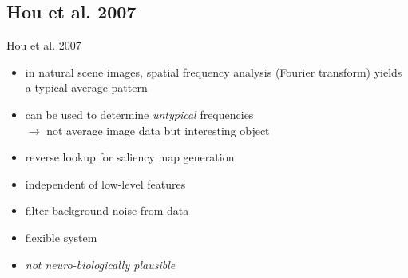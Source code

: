 \documentclass[compress,t]{beamer}
\begin{document}
\subsection{Hou et al. 2007}
\begin{frame}{Hou et al. 2007}
    \begin{itemize}
        \item in natural scene images, spatial frequency analysis (Fourier transform) yields a typical average pattern
        \item can be used to determine \emph{untypical} frequencies \\ $\rightarrow$ not average image data but interesting object
        \item reverse lookup for saliency map generation
    \end{itemize}
    \pause
    \begin{itemize}
        \item independent of low-level features
        \item filter background noise from data
        \item flexible system
        \item \emph{not neuro-biologically plausible}
    \end{itemize}
\end{frame}

\end{document}
